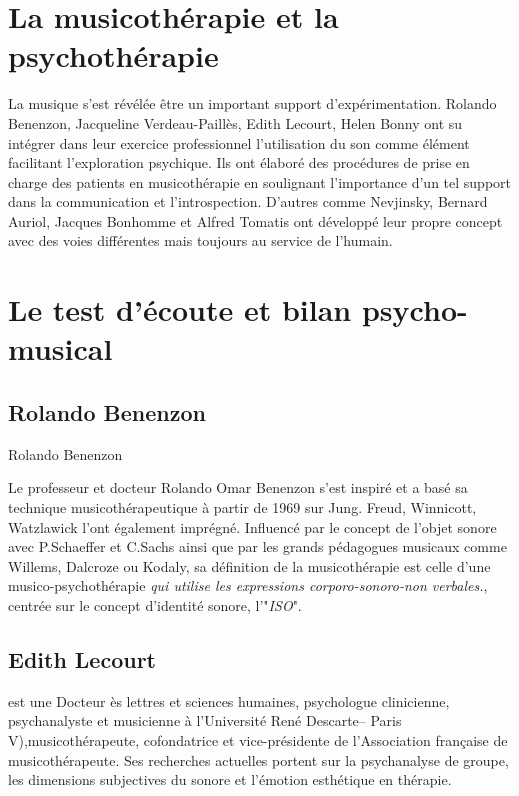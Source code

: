   
\section{La musicothérapie et la psychothérapie}
\label{musicothEtpsycho}

	 La musique s'est révélée  être un important support d'expérimentation.
	 Rolando Benenzon, Jacqueline Verdeau-Paillès, Edith
         Lecourt, Helen Bonny ont su intégrer dans leur exercice professionnel l'utilisation du son comme
          élément facilitant l'exploration psychique. 
	  Ils ont élaboré des procédures de prise en charge des patients en 
	  musicothérapie en soulignant  
	   l'importance d'un tel support dans la  communication et
           l'introspection.
           D'autres comme Nevjinsky, Bernard Auriol, Jacques Bonhomme
           et Alfred Tomatis ont développé leur propre concept avec
           des voies différentes mais toujours au service de l'humain. 

\section{Le test d'écoute et bilan psycho-musical}
	  
\subsection{Rolando Benenzon}
Rolando Benenzon
	  
	  \label{benenzon}
	  Le professeur et docteur Rolando Omar Benenzon s'est inspiré et a basé sa technique 
	  musicothérapeutique à partir de 1969 
	  sur Jung.  Freud, Winnicott, Watzlawick l'ont également imprégné. 
	  Influencé par le concept de l'objet sonore  avec P.Schaeffer et C.Sachs 
	  ainsi que par les grands pédagogues musicaux comme Willems,
          Dalcroze ou Kodaly, sa définition de la musicothérapie est celle d'une musico-psychothérapie  
	  \emph{\textsl{qui utilise les expressions corporo-sonoro-non verbales.}}, 
	  centrée sur le concept d'identité sonore, l'"\textit{ISO}".

        \subsection{Edith Lecourt} est une Docteur ès lettres et sciences 
        humaines, psychologue clinicienne, psychanalyste et musicienne à l'Université René Descarte-- Paris 
        V),musicothérapeute, cofondatrice  et vice-présidente de
        l'Association française de musicothérapeute. Ses recherches
        actuelles portent sur la psychanalyse de groupe, les
        dimensions subjectives du sonore  et l'émotion esthétique en thérapie.
    
